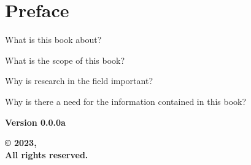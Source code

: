 \chapter*{Preface}
\label{ch:preface}

What is this book about?

What is the scope of this book?

Why is research in the field important?

Why is there a need for the information contained in this book?

\newpage
{
  \vspace*{\fill}
  \begin{center}
    \begin{minipage}{0.8\textwidth}
      \begin{center}
        \textbf{Version 0.0.0a}
      \end{center}
      \begin{flushright}
        \textbf{© 2023, \theauthor}\\
        \textbf{All rights reserved.}
      \end{flushright}
    \end{minipage}
  \end{center}
}

